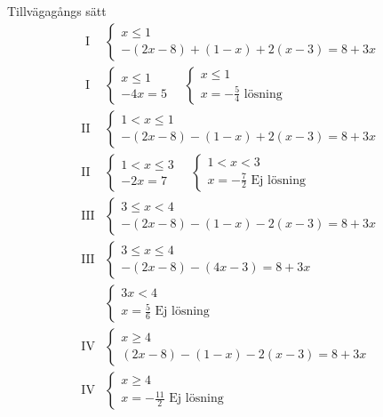 \begin{multicols}{2}
\begin{exampleblock}{Tillvägagångs sätt}
\begin{align*}
\text{ I } &\left\{ \begin{array} { l } { x \leq 1 } \\ { - ( 2 x - 8 ) + ( 1 - x ) + 2 ( x - 3 ) = 8 + 3 x } \end{array} \right. \\
\text{ I } &\left\{ \begin{array} { l } { x \leq 1 } \\ { - 4 x = 5 } \end{array}  \quad \left\{ \begin{array} { l } { x \leq 1 } \\ { x = - \frac { 5 } { 4 } \text{ lösning}} \end{array} \right. \right. \\
\text{II } &\left\{ \begin{array} { l } { 1 < x \leq 1 } \\ { - ( 2 x - 8 ) - ( 1 - x ) + 2 ( x - 3 ) = 8 + 3 x } \end{array} \right. \\
\text{II } &\left\{ \begin{array} { l } { 1 < x \leq 3 } \\ { - 2 x = 7 } \end{array} \quad \left\{ \begin{array} { l } { 1 < x < 3 } \\ { x = - \frac { 7 } { 2 } \text{ Ej lösning} } \end{array} \right. \right. \\
\text{III} &\left\{ \begin{array} { l } { 3 \leq x < 4 } \\ { - ( 2 x - 8 ) - ( 1 - x ) - 2 ( x - 3 ) = 8 + 3 x } \end{array} \right. \\
\text{III} &\left\{ \begin{array} { l } { 3 \leq x \leq 4 } \\ { - ( 2 x - 8 ) - ( 4 x - 3 ) = 8 + 3 x } \end{array} \right.\\
&\left\{ \begin{array} { l } { 3x < 4 } \\ { x = \frac{5}{6} \text{ Ej lösning} } \end{array} \right. \\
\text{IV} &\left\{ \begin{array} { l } { x \geq 4 } \\ { ( 2 x - 8 ) - ( 1 - x ) - 2 ( x - 3 ) = 8 + 3 x } \end{array} \right. \\
\text{IV} &\left\{ \begin{array} { l } { x \geq 4 } \\ { x = - \frac { 11 } { 2 } \text{ Ej lösning} } \end{array} \right. \\ 
\end{align*}
\end{exampleblock}



\end{multicols}
